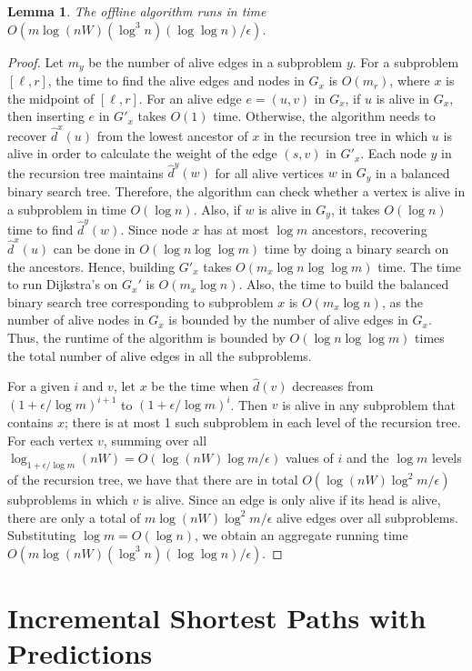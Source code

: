 \documentclass[11pt]{article}
\newtheorem{lemma}{Lemma}
\begin{document}
\begin{lemma}
\label{lem:offline-runtime}
    The offline algorithm runs in time $O(m\log (nW)  (\log^3 n) (\log \log n)/\epsilon)$.
\end{lemma}
\begin{proof}
    Let $m_y$ be the number of alive edges in a subproblem $y$.
    For a subproblem $[\ell, r]$, the time to find the alive edges and nodes in $G_x$ is $O(m_r)$, where $x$ is the midpoint of $[\ell, r]$. 
    For an alive edge $e = (u,v)$ in $G_x$, if $u$ is alive in $G_x$, then inserting $e$ in $G'_x$ takes $O(1)$ time.
    Otherwise, the algorithm needs to recover $\hat{d}^x(u)$ from the lowest ancestor of $x$ in the recursion tree in which $u$ is alive in order to calculate the weight of the edge $(s, v)$ in $G'_x$. 
    Each node $y$ in the recursion tree maintains $\hat{d}^{y}(w)$ for all alive vertices $w$ in $G_{y}$ in a balanced binary search tree.
    Therefore, the algorithm can check whether a vertex is alive in a subproblem in time $O(\log n)$.
    Also, if $w$ is alive in $G_y$, it takes $O(\log n)$ time to find $\hat{d}^y(w)$.
    Since node $x$ has at most $\log m$ ancestors, recovering $\hat{d}^x(u)$ can be done in $O(\log n \log\log m)$ time by doing a binary search on the ancestors.
    Hence, building $G'_x$ takes $O(m_x\log n \log\log m)$ time. 
    The time to run Dijkstra's on $G_x'$ is $O(m_x \log n)$.
    Also, the time to build the balanced binary search tree corresponding to subproblem $x$ is $O(m_x \log n)$, as the number of alive nodes in $G_x$ is bounded by the number of alive edges in $G_x$.
    Thus, the runtime of the algorithm is bounded by $O(\log n \log \log m)$ times the total number of alive edges in all the subproblems.
    
    For a given $i$ and $v$, let $x$ be the time when $\hat{d}(v)$ decreases from $( 1 + \epsilon/\log m)^{i+1}$ to $(1 + \epsilon/\log m)^i$.  
    Then $v$ is alive in any subproblem that contains $x$; there is at most 1 such subproblem in each level of the recursion tree.
    For each vertex $v$, summing over all $\log_{1 + \epsilon/\log m} (nW) = O(\log (nW) \log m/\epsilon)$ values of $i$ and the $\log m$ levels of the recursion tree, we have that there are in total $O(\log (nW) \log^2 m/\epsilon)$ subproblems in which $v$ is alive.
    Since an edge is only alive if its head is alive, there are only a total of $m \log (nW) \log^2 m/\epsilon$ alive edges over all subproblems.  
    Substituting $\log m = O(\log n)$, we obtain an aggregate running time $O(m\log (nW)(\log^3 n)(\log \log n)/\epsilon)$. 
\end{proof} \section{Incremental Shortest Paths with Predictions}
\end{document}
